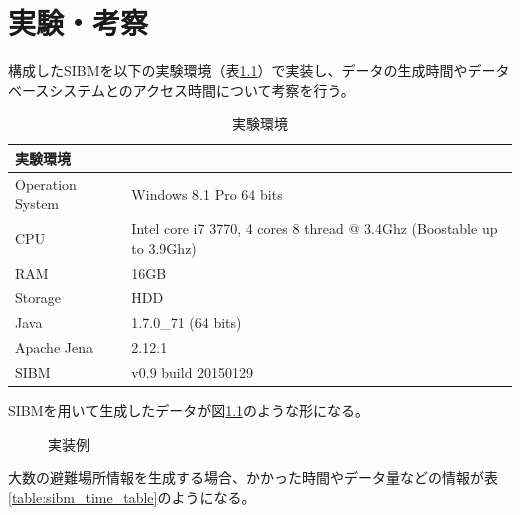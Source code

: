 ﻿%
\chapter{実験・考察}

構成したSIBMを以下の実験環境（表\ref{table:sibm_env}）で実装し、データの生成時間やデータベースシステムとのアクセス時間について考察を行う。

\begin{table}[h]
	\begin{center}
	\begin{tabular}{| l  p{45mm} |}
		\hline
		\rowstyle{\bfseries}
		実験環境 & \\
		\hline
		Operation System & Windows 8.1 Pro 64 bits \\
		CPU & Intel core i7 3770, 4 cores 8 thread @ 3.4Ghz (Boostable up to 3.9Ghz)
		\\
		RAM & 16GB \\
		Storage & HDD \\
		Java & 1.7.0\_71 (64 bits) \\
		Apache Jena & 2.12.1 \\
		SIBM & v0.9 build 20150129 \\
		\hline
	\end{tabular}
	\caption{実験環境}
	\label{table:sibm_env}
	\end{center}
\end{table}

SIBMを用いて生成したデータが図\ref{fig:sibm_sample}のような形になる。
	
\begin{figure}[h!]
	
  	\caption{実装例}
  	\label{fig:sibm_sample}
\end{figure}

大数の避難場所情報を生成する場合、かかった時間やデータ量などの情報が表\ref{table:sibm_time_table}のようになる。

